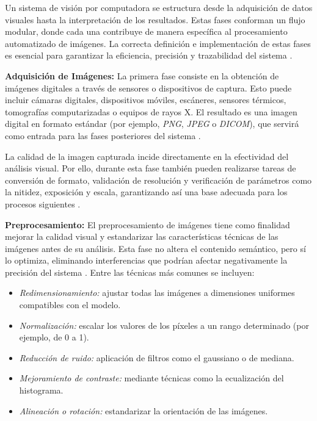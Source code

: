 {Un sistema de visión por computadora se estructura desde la adquisición de datos visuales hasta la interpretación de los resultados. Estas fases conforman un flujo modular, donde cada una contribuye de manera específica al procesamiento automatizado de imágenes. La correcta definición e implementación de estas fases es esencial para garantizar la eficiencia, precisión y trazabilidad del sistema \cite{szeliski2022}.

\textbf{Adquisición de Imágenes:} La primera fase consiste en la obtención de imágenes digitales a través de sensores o dispositivos de captura. Esto puede incluir cámaras digitales, dispositivos móviles, escáneres, sensores térmicos, tomografías computarizadas o equipos de rayos X. El resultado es una imagen digital en formato estándar (por ejemplo, \textit{PNG}, \textit{JPEG} o \textit{DICOM}), que servirá como entrada para las fases posteriores del sistema \cite{wang2020}.

La calidad de la imagen capturada incide directamente en la efectividad del análisis visual. Por ello, durante esta fase también pueden realizarse tareas de conversión de formato, validación de resolución y verificación de parámetros como la nitidez, exposición y escala, garantizando así una base adecuada para los procesos siguientes \cite{gonzalez2018}.

\textbf{Preprocesamiento:} El preprocesamiento de imágenes tiene como finalidad mejorar la calidad visual y estandarizar las características técnicas de las imágenes antes de su análisis. Esta fase no altera el contenido semántico, pero sí lo optimiza, eliminando interferencias que podrían afectar negativamente la precisión del sistema \cite{jain2021}. Entre las técnicas más comunes se incluyen:

\begin{itemize}
  \item \textit{Redimensionamiento:} ajustar todas las imágenes a dimensiones uniformes compatibles con el modelo.
  \item \textit{Normalización:} escalar los valores de los píxeles a un rango determinado (por ejemplo, de 0 a 1).
  \item \textit{Reducción de ruido:} aplicación de filtros como el gaussiano o de mediana.
  \item \textit{Mejoramiento de contraste:} mediante técnicas como la ecualización del histograma.
  \item \textit{Alineación o rotación:} estandarizar la orientación de las imágenes.
\end{itemize}

}
